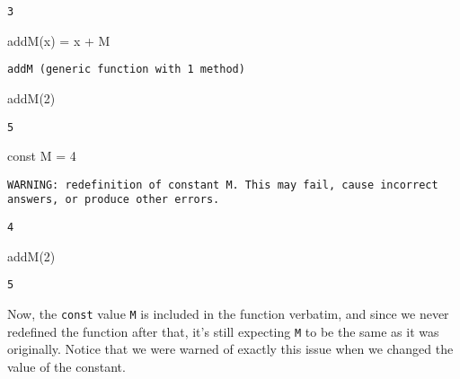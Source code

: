 \documentclass[
  letterpaper,
  DIV=11,
  numbers=noendperiod]{scrreprt}
\newenvironment{Shaded}{\begin{snugshade}}{\end{snugshade}}
\newcommand{\FloatTok}[1]{\textcolor[rgb]{0.68,0.00,0.00}{#1}}
\newcommand{\FunctionTok}[1]{\textcolor[rgb]{0.28,0.35,0.67}{#1}}
\newcommand{\KeywordTok}[1]{\textcolor[rgb]{0.00,0.23,0.31}{#1}}
\newcommand{\NormalTok}[1]{\textcolor[rgb]{0.00,0.23,0.31}{#1}}
\newcommand{\OperatorTok}[1]{\textcolor[rgb]{0.37,0.37,0.37}{#1}}
\begin{document}
\begin{verbatim}
3
\end{verbatim}

\begin{Shaded}
\begin{Highlighting}[]
\FunctionTok{addM}\NormalTok{(x) }\OperatorTok{=}\NormalTok{ x }\OperatorTok{+}\NormalTok{ M}
\end{Highlighting}
\end{Shaded}

\begin{verbatim}
addM (generic function with 1 method)
\end{verbatim}

\begin{Shaded}
\begin{Highlighting}[]
\FunctionTok{addM}\NormalTok{(}\FloatTok{2}\NormalTok{)}
\end{Highlighting}
\end{Shaded}

\begin{verbatim}
5
\end{verbatim}

\begin{Shaded}
\begin{Highlighting}[]
\KeywordTok{const}\NormalTok{ M }\OperatorTok{=} \FloatTok{4}
\end{Highlighting}
\end{Shaded}

\begin{verbatim}
WARNING: redefinition of constant M. This may fail, cause incorrect answers, or produce other errors.
\end{verbatim}

\begin{verbatim}
4
\end{verbatim}

\begin{Shaded}
\begin{Highlighting}[]
\FunctionTok{addM}\NormalTok{(}\FloatTok{2}\NormalTok{)}
\end{Highlighting}
\end{Shaded}

\begin{verbatim}
5
\end{verbatim}

Now, the \texttt{const} value \texttt{M} is included in the function
verbatim, and since we never redefined the function after that, it's
still expecting \texttt{M} to be the same as it was originally. Notice
that we were warned of exactly this issue when we changed the value of
the constant.
\end{document}
